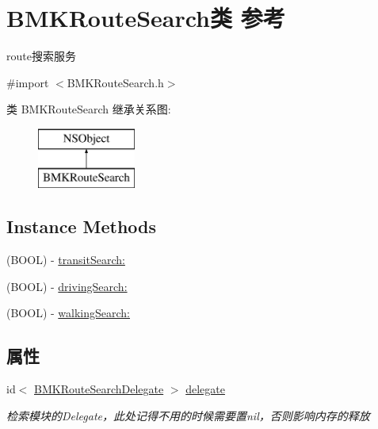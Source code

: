 \hypertarget{interface_b_m_k_route_search}{}\section{B\+M\+K\+Route\+Search类 参考}
\label{interface_b_m_k_route_search}


route搜索服务  




{\ttfamily \#import $<$B\+M\+K\+Route\+Search.\+h$>$}

类 B\+M\+K\+Route\+Search 继承关系图\+:\begin{figure}[H]
\begin{center}
\leavevmode
\includegraphics[height=2.000000cm]{interface_b_m_k_route_search}
\end{center}
\end{figure}
\subsection*{Instance Methods}
\begin{DoxyCompactItemize}
\item 
(B\+O\+O\+L) -\/ \hyperlink{interface_b_m_k_route_search_af5fd9df6e0d4940ca0a2bf7823dc95a8}{transit\+Search\+:}
\item 
(B\+O\+O\+L) -\/ \hyperlink{interface_b_m_k_route_search_a64bca1276cae03de35f61a0f733d6135}{driving\+Search\+:}
\item 
(B\+O\+O\+L) -\/ \hyperlink{interface_b_m_k_route_search_a40676ec66d861873d8e0117feb3e2483}{walking\+Search\+:}
\end{DoxyCompactItemize}
\subsection*{属性}
\begin{DoxyCompactItemize}
\item 
\hypertarget{interface_b_m_k_route_search_a5f41c24c0894bb01bb12cacf5c410d95}{}id$<$ \hyperlink{protocol_b_m_k_route_search_delegate-p}{B\+M\+K\+Route\+Search\+Delegate} $>$ \hyperlink{interface_b_m_k_route_search_a5f41c24c0894bb01bb12cacf5c410d95}{delegate}\label{interface_b_m_k_route_search_a5f41c24c0894bb01bb12cacf5c410d95}

\begin{DoxyCompactList}\small\item\em 检索模块的\+Delegate，此处记得不用的时候需要置nil，否则影响内存的释放 \end{DoxyCompactList}\end{DoxyCompactItemize}


